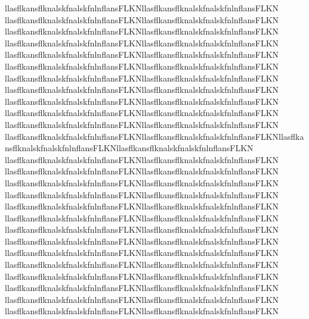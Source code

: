 \documentclass[final]{beamer}
\begin{document}
\begin{minipage}{0.5\textwidth}
    llasflkansflknalskfnalskfnlnflansFLKNllasflkansflknalskfnalskfnlnflansFLKN
    llasflkansflknalskfnalskfnlnflansFLKNllasflkansflknalskfnalskfnlnflansFLKN
    llasflkansflknalskfnalskfnlnflansFLKNllasflkansflknalskfnalskfnlnflansFLKN
    llasflkansflknalskfnalskfnlnflansFLKNllasflkansflknalskfnalskfnlnflansFLKN
    llasflkansflknalskfnalskfnlnflansFLKNllasflkansflknalskfnalskfnlnflansFLKN
    llasflkansflknalskfnalskfnlnflansFLKNllasflkansflknalskfnalskfnlnflansFLKN
    llasflkansflknalskfnalskfnlnflansFLKNllasflkansflknalskfnalskfnlnflansFLKN
    llasflkansflknalskfnalskfnlnflansFLKNllasflkansflknalskfnalskfnlnflansFLKN
    llasflkansflknalskfnalskfnlnflansFLKNllasflkansflknalskfnalskfnlnflansFLKN
    llasflkansflknalskfnalskfnlnflansFLKNllasflkansflknalskfnalskfnlnflansFLKN
    llasflkansflknalskfnalskfnlnflansFLKNllasflkansflknalskfnalskfnlnflansFLKN    llasflkansflknalskfnalskfnlnflansFLKNllasflkansflknalskfnalskfnlnflansFLKNllasflkansflknalskfnalskfnlnflansFLKNllasflkansflknalskfnalskfnlnflansFLKN    llasflkansflknalskfnalskfnlnflansFLKNllasflkansflknalskfnalskfnlnflansFLKN
    llasflkansflknalskfnalskfnlnflansFLKNllasflkansflknalskfnalskfnlnflansFLKN
    llasflkansflknalskfnalskfnlnflansFLKNllasflkansflknalskfnalskfnlnflansFLKN    llasflkansflknalskfnalskfnlnflansFLKNllasflkansflknalskfnalskfnlnflansFLKN
    llasflkansflknalskfnalskfnlnflansFLKNllasflkansflknalskfnalskfnlnflansFLKN
    llasflkansflknalskfnalskfnlnflansFLKNllasflkansflknalskfnalskfnlnflansFLKN
    llasflkansflknalskfnalskfnlnflansFLKNllasflkansflknalskfnalskfnlnflansFLKN
    llasflkansflknalskfnalskfnlnflansFLKNllasflkansflknalskfnalskfnlnflansFLKN
    llasflkansflknalskfnalskfnlnflansFLKNllasflkansflknalskfnalskfnlnflansFLKN
    llasflkansflknalskfnalskfnlnflansFLKNllasflkansflknalskfnalskfnlnflansFLKN
    llasflkansflknalskfnalskfnlnflansFLKNllasflkansflknalskfnalskfnlnflansFLKN
    llasflkansflknalskfnalskfnlnflansFLKNllasflkansflknalskfnalskfnlnflansFLKN
    llasflkansflknalskfnalskfnlnflansFLKNllasflkansflknalskfnalskfnlnflansFLKN
    llasflkansflknalskfnalskfnlnflansFLKNllasflkansflknalskfnalskfnlnflansFLKN
\end{minipage}
\end{document}
